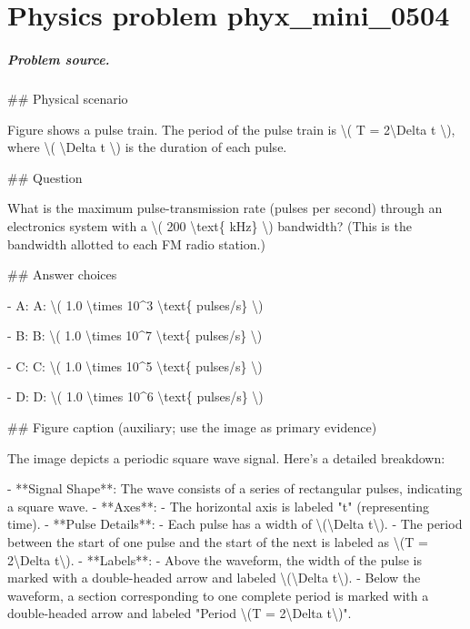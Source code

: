 
\chapter{Physics problem phyx\_mini\_0504}
\label{ch:PhyXMiniProblems_problem_phyx_mini_0504}

\paragraph{Problem source.}
\#\# Physical scenario

Figure shows a pulse train. The period of the pulse train is \textbackslash{}( T = 2\textbackslash{}Delta t \textbackslash{}), where \textbackslash{}( \textbackslash{}Delta t \textbackslash{}) is the duration of each pulse.

\#\# Question

What is the maximum pulse-transmission rate (pulses per second) through an electronics system with a \textbackslash{}( 200 \textbackslash{}text\{ kHz\} \textbackslash{}) bandwidth? (This is the bandwidth allotted to each FM radio station.)

\#\# Answer choices

- A: A: \textbackslash{}( 1.0 \textbackslash{}times 10\textasciicircum{}3 \textbackslash{}text\{ pulses/s\} \textbackslash{})

- B: B: \textbackslash{}( 1.0 \textbackslash{}times 10\textasciicircum{}7 \textbackslash{}text\{ pulses/s\} \textbackslash{})

- C: C: \textbackslash{}( 1.0 \textbackslash{}times 10\textasciicircum{}5 \textbackslash{}text\{ pulses/s\} \textbackslash{})

- D: D: \textbackslash{}( 1.0 \textbackslash{}times 10\textasciicircum{}6 \textbackslash{}text\{ pulses/s\} \textbackslash{})

\#\# Figure caption (auxiliary; use the image as primary evidence)

The image depicts a periodic square wave signal. Here's a detailed breakdown:

- **Signal Shape**: The wave consists of a series of rectangular pulses, indicating a square wave.
- **Axes**: 
  - The horizontal axis is labeled "t" (representing time).
- **Pulse Details**: 
  - Each pulse has a width of \textbackslash{}(\textbackslash{}Delta t\textbackslash{}).
  - The period between the start of one pulse and the start of the next is labeled as \textbackslash{}(T = 2\textbackslash{}Delta t\textbackslash{}).
- **Labels**:
  - Above the waveform, the width of the pulse is marked with a double-headed arrow and labeled \textbackslash{}(\textbackslash{}Delta t\textbackslash{}).
  - Below the waveform, a section corresponding to one complete period is marked with a double-headed arrow and labeled "Period \textbackslash{}(T = 2\textbackslash{}Delta t\textbackslash{})".

